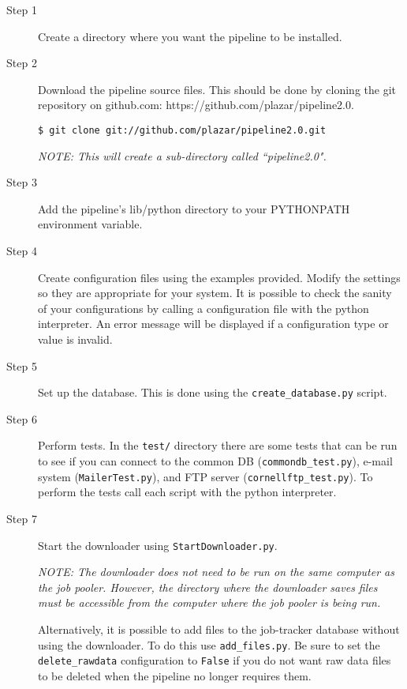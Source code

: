 \begin{description}
    \item[Step 1] Create a directory where you want the pipeline to be installed.

    \item[Step 2] Download the pipeline source files. This should be done by cloning the git repository on github.com: https://github.com/plazar/pipeline2.0.

        \smallskip

        \texttt{\$ git clone git://github.com/plazar/pipeline2.0.git}

        \smallskip
        
        \textit{NOTE: This will create a sub-directory called ``pipeline2.0".} 

    \item[Step 3] Add the pipeline's lib/python directory to your PYTHONPATH environment variable. 

    \item[Step 4] Create configuration files using the examples provided. Modify the settings so they are appropriate for your system. It is possible to check the sanity of your configurations by calling a configuration file with the python interpreter. An error message will be displayed if a configuration type or value is invalid.  

    \item[Step 5] Set up the database. This is done using the \texttt{create\_database.py} script.

    \item[Step 6] Perform tests. In the \texttt{test/} directory there are some tests that can be run to see if you can connect to the common DB (\texttt{commondb\_test.py}), e-mail system (\texttt{MailerTest.py}), and FTP server (\texttt{cornellftp\_test.py}). To perform the tests call each script with the python interpreter.

    \item[Step 7] Start the downloader using \texttt{StartDownloader.py}.
        
        \smallskip
        
        \textit{NOTE: The downloader does not need to be run on the same computer as the job pooler. However, the directory where the downloader saves files must be accessible from the computer where the job pooler is being run.}
        
        \smallskip
        
        Alternatively, it is possible to add files to the job-tracker database without using the downloader. To do this use \texttt{add\_files.py}. Be sure to set the \texttt{delete\_rawdata} configuration to \texttt{False} if you do not want raw data files to be deleted when the pipeline no longer requires them. 


\end{description}
